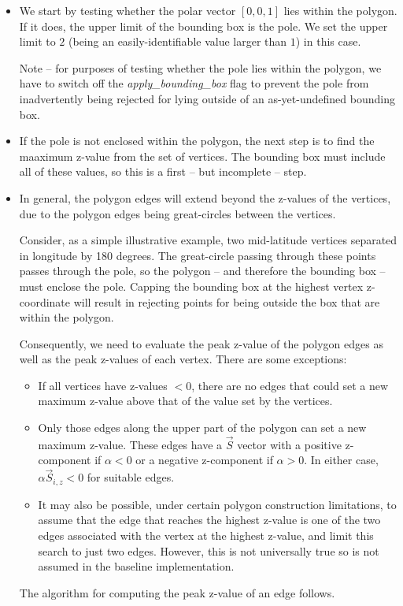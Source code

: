 \documentclass[11pt,fleqn]{report}
\begin{document}
\begin{itemize}
  \item We start by testing whether the polar vector $[0,0,1]$ lies within the
    polygon. If it does, the upper limit of the bounding box is the pole. We
    set the upper limit to $2$ (being an easily-identifiable  value larger
    than $1$) in this case.

    Note -- for purposes of testing whether the pole lies within the polygon,
    we have to switch off the \textit{apply\_bounding\_box} flag to prevent
    the pole from inadvertently being rejected for lying outside of an
    as-yet-undefined bounding box.

  \item If the pole is not enclosed within the polygon, the next step is to
    find the maaximum z-value from the set of vertices. The bounding box
    must include all of these values, so this is a first -- but incomplete
    -- step.

  \item In general, the polygon edges will extend beyond the z-values of the
    vertices, due to the polygon edges being great-circles between the
    vertices.

    Consider, as a simple illustrative example, two mid-latitude
    vertices separated in longitude by 180 degrees. The great-circle passing
    through these points passes through the pole, so the polygon -- and
    therefore the bounding box -- must enclose the pole. Capping the
    bounding box at the highest vertex z-coordinate will result in rejecting
    points for being outside the box that are within the polygon.

    Consequently, we need to evaluate the peak z-value of the polygon edges
    as well as the peak z-values of each vertex. There are some exceptions:
    \begin{itemize}
      \item If all vertices have z-values $< 0$, there are no edges that could
        set a new maximum z-value above that of the value set by the vertices.
      \item Only those edges along the upper part of the polygon can set a
        new maximum z-value. These edges have a $\vec S$ vector with a
        positive z-component if $\alpha <0$ or a negative z-component if
        $\alpha >0$. In either case, $\alpha \vec S_{i,z} < 0$ for suitable
        edges.
      \item It may also be possible, under
        certain polygon construction limitations, to assume that the edge
        that reaches the highest z-value is one of the two edges associated
        with the vertex at the highest z-value, and limit this search to just
        two edges. However, this is not universally true so is not assumed in
        the baseline implementation.
    \end{itemize}
    The algorithm for computing the peak z-value of an edge follows.
\end{itemize}
\end{document}
